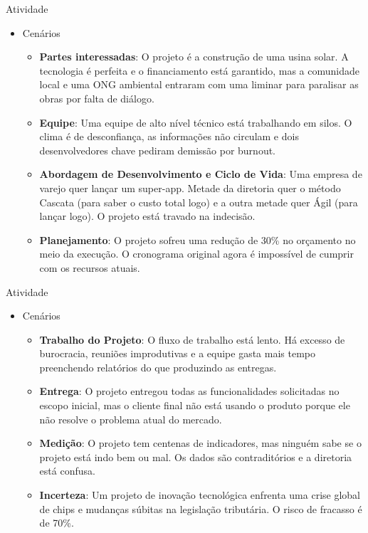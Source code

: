 \documentclass{beamer}
\begin{document}
\begin{frame}{Atividade}
	\begin{itemize}
		\item Cenários
			\begin{itemize}
				\justifying
				\item \textbf{Partes interessadas}: O projeto é a construção de uma usina solar. A tecnologia é perfeita e o financiamento está garantido, mas a comunidade local e uma ONG ambiental entraram com uma liminar para paralisar as obras por falta de diálogo.
				\item \textbf{Equipe}: Uma equipe de alto nível técnico está trabalhando em silos. O clima é de desconfiança, as informações não circulam e dois desenvolvedores chave pediram demissão por burnout.
				\item \textbf{Abordagem de Desenvolvimento e Ciclo de Vida}: Uma empresa de varejo quer lançar um super-app. Metade da diretoria quer o método Cascata (para saber o custo total logo) e a outra metade quer Ágil (para lançar logo). O projeto está travado na indecisão.
				\item \textbf{Planejamento}: O projeto sofreu uma redução de 30\% no orçamento no meio da execução. O cronograma original agora é impossível de cumprir com os recursos atuais.
			\end{itemize}
	\end{itemize}
\end{frame}

\begin{frame}{Atividade}
	\begin{itemize}
		\item Cenários
		\begin{itemize}
			\justifying
			\item \textbf{Trabalho do Projeto}: O fluxo de trabalho está lento. Há excesso de burocracia, reuniões improdutivas e a equipe gasta mais tempo preenchendo relatórios do que produzindo as entregas.
			\item \textbf{Entrega}: O projeto entregou todas as funcionalidades solicitadas no escopo inicial, mas o cliente final não está usando o produto porque ele não resolve o problema atual do mercado.
			\item \textbf{Medição}: O projeto tem centenas de indicadores, mas ninguém sabe se o projeto está indo bem ou mal. Os dados são contraditórios e a diretoria está confusa.
			\item \textbf{Incerteza}: Um projeto de inovação tecnológica enfrenta uma crise global de chips e mudanças súbitas na legislação tributária. O risco de fracasso é de 70\%.
		\end{itemize}
	\end{itemize}
\end{frame}
\end{document}
